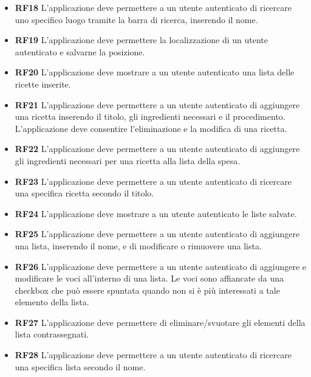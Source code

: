 \documentclass[a4paper,12pt]{article}
\begin{document}
\begin{itemize}
\item \textbf {\hypertarget{RF18}{RF18}} L'applicazione deve permettere a un utente autenticato di ricercare uno specifico luogo tramite la barra di ricerca, inserendo il nome.
\item \textbf {\hypertarget{RF19}{RF19}} L'applicazione deve permettere la localizzazione di un utente autenticato e salvarne la posizione.
\item \textbf {\hypertarget{RF20}{RF20}} L'applicazione deve mostrare a un utente autenticato una lista delle ricette inserite.
\item \textbf {\hypertarget{RF21}{RF21}} L'applicazione deve permettere a un utente autenticato di aggiungere una ricetta inserendo il titolo, gli ingredienti necessari e il procedimento. L'applicazione deve consentire l'eliminazione e la modifica di una ricetta.
\item \textbf {\hypertarget{RF22}{RF22}} L'applicazione deve permettere a un utente autenticato di aggiungere gli ingredienti necessari per una ricetta alla lista della spesa.
\item \textbf {\hypertarget{RF23}{RF23}} L'applicazione deve permettere a un utente autenticato di ricercare una specifica ricetta secondo il titolo.
\item \textbf {\hypertarget{RF24}{RF24}} L'applicazione deve mostrare a un utente autenticato le liste salvate.
\item \textbf {\hypertarget{RF25}{RF25}} L'applicazione deve permettere a un utente autenticato di aggiungere una lista, inserendo il nome, e di modificare o rimuovere una lista.
\item \textbf {\hypertarget{RF26}{RF26}} L'applicazione deve permettere a un utente autenticato di aggiungere e modificare le voci all'interno di una lista. Le voci sono affiancate da una checkbox che può essere spuntata quando non si è più interessati a tale elemento della lista. 
\item \textbf {\hypertarget{RF27}{RF27}} L'applicazione deve permettere di eliminare/svuotare gli elementi della lista contrassegnati.
\item \textbf {\hypertarget{RF28}{RF28}} L'applicazione deve permettere a un utente autenticato di ricercare una specifica lista secondo il nome.
\end{itemize}
\end{document}
